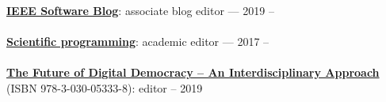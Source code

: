 \href{http://blog.ieeesoftware.org/}{\textbf{IEEE Software Blog}}: associate blog editor --- 2019 -- 
\\ \halfblankline \\
\href{https://www.hindawi.com/journals/sp/}{\textbf{Scientific programming}}: academic editor --- 2017 --
\\ \halfblankline \\
\href{https://www.springer.com/gp/book/9783030053321}{\textbf{The Future of Digital Democracy -- An Interdisciplinary Approach}} (ISBN 978-3-030-05333-8): editor -- 2019
